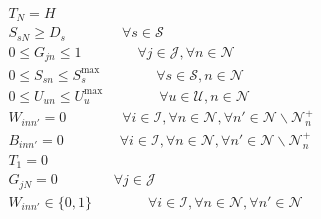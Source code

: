 \begin{align}
\begin{aligned}
\end{aligned} \label{castroTight}\\
	&T_N = H &&\\
	& S_{sN} \ge D_s  \qquad \qquad \forall s \in \mathcal{S} && \\
	& 0 \le G_{jn} \le 1 \qquad \qquad \forall j \in \mathcal{J}, \forall n \in \mathcal{N} && \\
	& 0 \le S_{sn} \le S_{s}^{\text{max}} \qquad \qquad \forall s \in \mathcal{S}, n \in \mathcal{N} && \\
	& 0 \le U_{un} \le U_{u}^{\text{max}} \qquad \qquad \forall u \in \mathcal{U}, n \in \mathcal{N} && \\
	& W_{inn'} = 0 \qquad \qquad \forall i \in \mathcal{I}, \forall n \in \mathcal{N}, \forall n' \in \mathcal{N} \backslash \mathcal{N}_{n}^+ &&\\
	& B_{inn'} = 0 \qquad \qquad \forall i \in \mathcal{I}, \forall n \in \mathcal{N}, \forall n' \in \mathcal{N} \backslash \mathcal{N}_{n}^+ &&\\
	& T_1 = 0 && \\
	& G_{jN} = 0 \qquad \qquad \forall j \in \mathcal{J} &&\\
	& W_{inn'} \in \{0,1\} \qquad \qquad \forall i \in \mathcal{I}, \forall n \in \mathcal{N}, \forall n' \in \mathcal{N} &&
\end{align}


